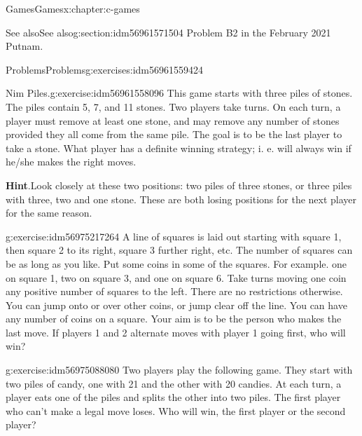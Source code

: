 \documentclass[twoside,10pt,]{book}
\newcommand{\blocktitlefont}{\relax}
\numberwithin{equation}{section}
\begin{document}
\begin{chapterptx}{Games}{}{Games}{}{}{x:chapter:c-games}
%
%
\typeout{************************************************}
\typeout{************************************************}
%
\begin{sectionptx}{See also}{}{See also}{}{}{g:section:idm56961571504}
Problem B2 in the February 2021 Putnam.%
\end{sectionptx}
%
%
\typeout{************************************************}
\typeout{************************************************}
%
\begin{exercises-section}{Problems}{}{Problems}{}{}{g:exercises:idm56961559424}
\begin{divisionexercise}{1}{Nim Piles.}{}{g:exercise:idm56961558096}%
This game starts with three piles of stones. The piles contain 5, 7, and 11 stones. Two players take turns. On each turn, a player must remove at least one stone, and may remove any number of stones provided they all come from the same pile. The goal is to be the last player to take a stone. What player has a definite winning strategy; i. e. will always win if he\slash{}she makes the right moves.%
\par\smallskip%
\noindent\textbf{\blocktitlefont Hint}.\hypertarget{g:hint:idm56961556848}{}\quad{}Look closely at these two positions: two piles of three stones, or three piles with three, two and one stone.   These are both losing positions for the next player for the same reason.%
\end{divisionexercise}%
\begin{divisionexercise}{2}{}{}{g:exercise:idm56975217264}%
A line of squares is laid out starting with square 1, then square 2 to its right, square 3 further right, etc.  The number of squares can be as long as you like. Put some coins in some of the squares.  For example.  one on square 1, two on square 3, and one on square 6.  Take turns moving one coin any positive number of squares to the left. There are no restrictions otherwise. You can jump onto or over other coins, or jump clear off the line. You can have any number of coins on a square. Your aim is to be the person who makes the last move.   If players 1 and 2 alternate moves with player 1 going first, who will win?%
\end{divisionexercise}%
\begin{divisionexercise}{3}{}{}{g:exercise:idm56975088080}%
Two players play the following game. They start with two piles of candy, one with 21 and the other with 20 candies. At each turn, a player eats one of the piles and splits the other into two piles. The first player who can't make a legal move loses. Who will win, the first player or the second player?%

\end{divisionexercise}
\end{exercises-section}
\end{chapterptx}
\end{document}
